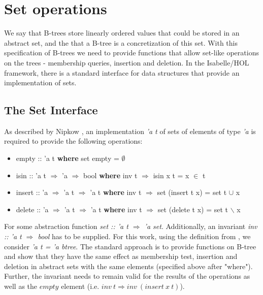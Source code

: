 \section{Set operations}

We say that B-trees store linearly ordered values
that could be stored in an abstract set,
and the that a B-tree is a concretization
of this set.
With this specification of B-trees we need to provide functions that allow
set-like operations on the trees -
membership queries, insertion and deletion.
In the Isabelle/HOL framework, there is a standard interface
for data structures that provide an implementation of sets.

\subsection{The Set Interface}

As described by Nipkow \parencite{DBLP:conf/itp/Nipkow16},
an implementation \textit{'a t} of sets of elements of type \textit{'a} is required to provide the following
operations:

\begin{itemize}
    \itshape
    \item empty :: 'a t \textup{\textbf{where}} set empty = $\emptyset$
    \item isin :: 'a t $\Rightarrow$ 'a $\Rightarrow$ bool \textup{\textbf{where}} inv t $\Longrightarrow$ isin x t = x $\in$ t
    \item insert :: 'a $\Rightarrow$ 'a t $\Rightarrow$ 'a t \textup{\textbf{where}} inv t $\Longrightarrow$ set (insert t x) = set t $\cup$ {x}
    \item delete :: 'a $\Rightarrow$ 'a t $\Rightarrow$ 'a t \textup{\textbf{where}} inv t $\Longrightarrow$ set (delete t x) = set t $\backslash$ {x}
\end{itemize}

For some abstraction function \textit{set :: 'a t $\Rightarrow$ 'a set}.
Additionally, an invariant \textit{inv :: 'a t $\Rightarrow$ bool} has to be supplied.
For this work, using the definition from ,
we consider \textit{'a t = 'a btree}.
The standard approach is to provide functions on B-tree and show
that they have the same effect as membership test, insertion and deletion 
in abstract sets with the same elements (specified above after "where").
Further, the invariant needs to remain valid for the results of the operations
as well as the $empty$ element (i.e. $inv\ t \Longrightarrow inv\ (insert\ x\ t)$).

